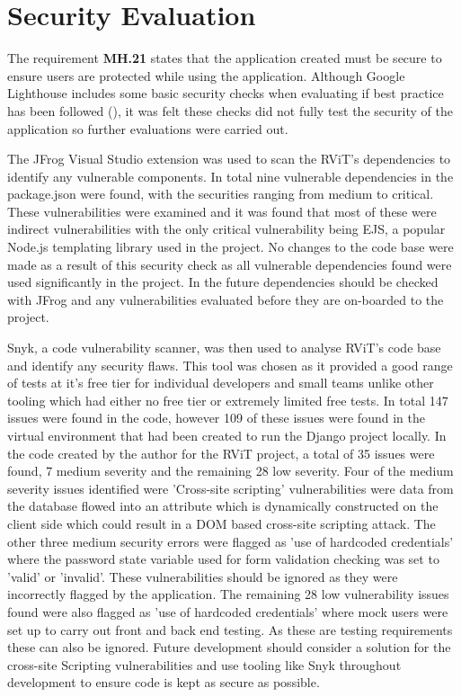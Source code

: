 \documentclass[l4proj.tex]{subfiles}
\begin{document}
\section{Security Evaluation}
The requirement \textbf{MH.21} states that the application created must be secure to ensure users are protected while using the application. Although Google Lighthouse includes some basic security checks when evaluating if best practice has been followed (\cite{LighthouseOverview}), it was felt these checks did not fully test the security of the application so further evaluations were carried out. 

The JFrog Visual Studio extension was used to scan the RViT's dependencies to identify any vulnerable components. In total nine vulnerable dependencies in the package.json were found, with the securities ranging from medium to critical. These vulnerabilities were examined and it was found that most of these were indirect vulnerabilities with the only critical vulnerability being EJS, a popular Node.js templating library used in the project. No changes to the code base were made as a result of this security check as all vulnerable dependencies found were used significantly in the project. In the future dependencies should be checked with JFrog and any vulnerabilities evaluated before they are on-boarded to the project. 

Snyk, a code vulnerability scanner, was then used to analyse RViT's code base and identify any security flaws. This tool was chosen as it provided a good range of tests at it's free tier for individual developers and small teams unlike other tooling which had either no free tier or extremely limited free tests. In total 147 issues were found in the code, however 109 of these issues were found in the virtual environment that had been created to run the Django project locally. In the code created by the author for the RViT project, a total of 35 issues were found, 7 medium severity and the remaining 28 low severity. Four of the medium severity issues identified were 'Cross-site scripting' vulnerabilities were data from the database flowed into an attribute which is dynamically constructed on the client side which could result in a DOM based cross-site scripting attack. The other three medium security errors were flagged as 'use of hardcoded credentials' where the password state variable used for form validation checking was set to 'valid' or 'invalid'. These vulnerabilities should be ignored as they were incorrectly flagged by the application. The remaining 28 low vulnerability issues found were also flagged as 'use of hardcoded credentials' where mock users were set up to carry out front and back end testing. As these are testing requirements these can also be ignored. Future development should consider a solution for the cross-site Scripting vulnerabilities and use tooling like Snyk throughout development to ensure code is kept as secure as possible.
\end{document}
